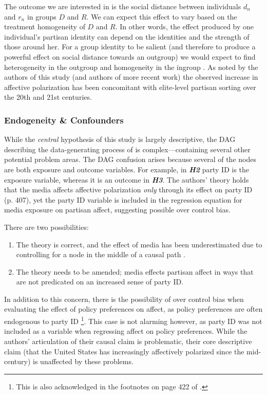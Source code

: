 \documentclass[12pt]{article}
\begin{document}
The outcome we are interested in is the social distance between individuals $d_n$ and $r_n$ in groups $D$ and $R$. We can expect this effect to vary based on the treatment homogeneity of $D$ and $R$. In other words, the effect produced by one individual’s partisan identity can depend on the identities and the strength of those around her. For a group identity to be salient (and therefore to produce a powerful effect on social distance towards an outgroup) we would expect to find heterogeneity in the outgroup and homogeneity in the ingroup \citep{rohde1991parties}. As noted by the authors of this study (and authors of more recent work) the observed increase in affective polarization has been concomitant with elite-level partisan sorting over the 20th and 21st centuries. 

\subsubsection{Endogeneity \& Confounders}


While the \textit{central} hypothesis of this study is largely descriptive, the DAG describing the data-generating process of \citeauthor{iyengar2012affect} is complex---containing several other potential problem areas. The DAG confusion arises because several of the nodes are both exposure and outcome variables. For example, in \textbf{\textit{H2}} party ID is the exposure variable, whereas it is an outcome in \textbf{\textit{H3}}. The authors' theory holds that the media affects affective polarization \textit{only} through its effect on party ID (p. 407), yet the party ID variable is included in the regression equation for media exposure on partisan affect, suggesting possible over control bias.

There are two possibilities:
\begin{enumerate}
\item The theory is correct, and the effect of media has been underestimated due to controlling for a node  in the middle of a causal path \citep{elwert2014endogenous}.
\item The theory needs to be amended; media effects partisan affect in ways that are not predicated on an increased sense of party ID.
\end{enumerate}
In addition to this concern, there is the possibility of over control bias when evaluating the effect of policy preferences on affect, as policy preferences are often endogenous to party ID \citep{druckman2013elite}\footnote{This is also acknowledged in the footnotes on page 422 of \citeauthor{iyengar2012affect}.}. This case is not alarming however, as party ID was not included as a variable when regressing affect on policy preferences. While the authors' articulation of their causal claim is problematic, their core descriptive claim (that the United States has increasingly affectively polarized since the mid- century) is unaffected by these problems.
\end{document}
